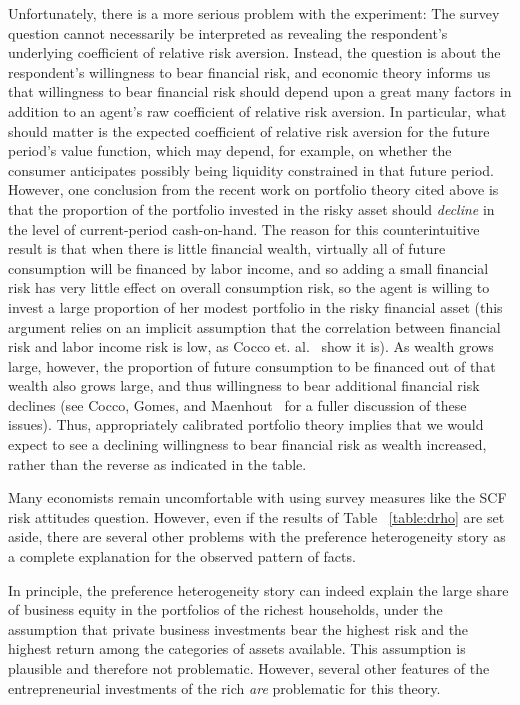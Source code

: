 \documentclass[12pt]{article}
\begin{document}
{\normalsize Unfortunately, there is a more serious problem with the
experiment: The survey question cannot necessarily be interpreted as
revealing the respondent's underlying coefficient of relative risk aversion.
Instead, the question is about the respondent's willingness to bear
financial risk, and economic theory informs us that willingness to bear
financial risk should depend upon a great many factors in addition to an
agent's raw coefficient of relative risk aversion. In particular, what
should matter is the expected coefficient of relative risk aversion for the
future period's value function, which may depend, for example, on whether
the consumer anticipates possibly being liquidity constrained in that future
period. However, one conclusion from the recent work on portfolio theory
cited above is that the proportion of the portfolio invested in the risky
asset should \textit{decline} in the level of current-period cash-on-hand.
The reason for this counterintuitive result is that when there is little
financial wealth, virtually all of future consumption will be financed by
labor income, and so adding a small financial risk has very little effect on
overall consumption risk, so the agent is willing to invest a large
proportion of her modest portfolio in the risky financial asset (this
argument relies on an implicit assumption that the correlation between
financial risk and labor income risk is low, as Cocco et. al.~\cite
{cgm:lcportfolio} show it is). As wealth grows large, however, the
proportion of future consumption to be financed out of that wealth also
grows large, and thus willingness to bear additional financial risk declines
(see Cocco, Gomes, and Maenhout~\cite{cgm:lcportfolio} for a fuller
discussion of these issues). Thus, appropriately calibrated portfolio theory
implies that we would expect to see a declining willingness to bear
financial risk as wealth increased, rather than the reverse as indicated in
the table. }

{\normalsize Many economists remain uncomfortable with using survey measures
like the SCF risk attitudes question. However, even if the results of Table~%
\ref{table:drho} are set aside, there are several other problems with the
preference heterogeneity story as a complete explanation for the observed
pattern of facts. }

{\normalsize In principle, the preference heterogeneity story can indeed
explain the large share of business equity in the portfolios of the richest
households, under the assumption that private business investments bear the
highest risk and the highest return among the categories of assets
available. This assumption is plausible and therefore not problematic.
However, several other features of the entrepreneurial investments of the
rich \textit{are} problematic for this theory. }
\end{document}
